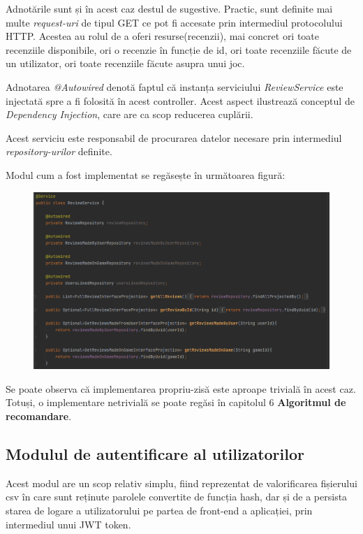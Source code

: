\documentclass[12pt,a4paper]{report}
\begin{document}
Adnotările sunt și în acest caz destul de sugestive. Practic, sunt definite mai multe \emph{request-uri} de tipul GET ce pot fi accesate prin intermediul protocolului HTTP. Acestea au rolul de a oferi resurse(recenzii), mai concret ori toate recenziile disponibile, ori o recenzie în funcție de id, ori toate recenziile făcute de un utilizator, ori toate recenziile făcute asupra unui joc.

Adnotarea \emph{@Autowired} denotă faptul că instanța serviciului \emph{ReviewService} este injectată spre a fi folosită în acest controller. Acest aspect ilustrează conceptul de \emph{Dependency Injection}, care are ca scop reducerea cuplării. \cite{23}

Acest serviciu este responsabil de procurarea datelor necesare prin intermediul \emph{repository-urilor} definite.

Modul cum a fost implementat se regăsește în următoarea figură:

\begin{figure}[H]
\centering
\caption{}
\includegraphics[scale = 0.65]{exemplu_22_review_service}
\caption*{}
\end{figure}

Se poate observa că implementarea propriu-zisă este aproape trivială în acest caz. Totuși, o implementare netrivială se poate regăsi în capitolul 6 \textbf{Algoritmul de recomandare}.





\subsection{Modulul de autentificare al utilizatorilor}


   Acest modul are un scop relativ simplu, fiind reprezentat de valorificarea fișierului csv în care sunt reținute parolele convertite de funcția hash, dar și de a persista starea de logare a utilizatorului pe partea de front-end a aplicației, prin intermediul unui JWT token. \cite{24}
\end{document}

